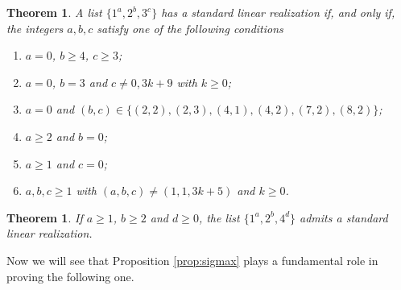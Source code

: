 \documentclass{amsart}
\newtheorem{thm}[prop]{Theorem}
\theoremstyle{definition}
\numberwithin{equation}{section}
\begin{document}
\begin{thm}\cite{CDF}\label{Capp}
A list $\{1^a,2^b,3^c\}$ has a standard linear realization if, and only if, the integers $a,b,c$
satisfy one of the following conditions
\begin{enumerate}
\item[(1)] $a=0$, $b\geq 4$, $c\geq 3$;
\item[(2)] $a=0$, $b=3$ and $c\neq0, 3k+9$ with $k\geq0$;
\item[(3)] $a=0$ and $(b,c)\in \{(2,2),(2,3),(4,1),(4,2),(7,2),(8,2)\}$;
\item[(4)] $a\geq 2$ and  $b=0$;
\item[(5)] $a\geq 1$ and $c=0$;
\item[(6)] $a,b,c\geq 1$ with $(a,b,c)\neq (1,1,3k+5)$ and $k\geq 0$.
\end{enumerate}
\end{thm}

\begin{thm}\cite{PPnew}\label{EJC}
If $a\geq 1$, $b\geq 2$ and $d\geq 0$, the list $\{1^a,2^b,4^d\}$ admits a standard linear realization.
\end{thm}

Now we will see that  Proposition \ref{prop:sigmax} plays a fundamental role in proving the following one.
\end{document}
